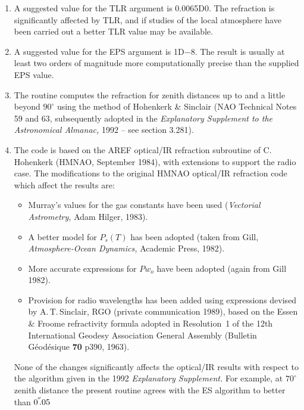 \documentclass[11pt,twoside]{article}
\newcommand{\arcsec}[2] {\arcseci{#1}$\hspace{-0.4em}.#2$}
\newcommand{\arcsec}[2] {
      {$#1\hspace{-0.05em}^{'\hspace{-0.1em}'}\hspace{-0.4em}.#2$}
   }
\newcommand{\arcseci}[1] {$#1\hspace{-0.05em}$\raisebox{-0.5ex}
                         {$^{'\hspace{-0.1em}'}$}}
\renewcommand{\arcseci}[1] {$#1\hspace{-0.05em}^{'\hspace{-0.1em}'}$}
\begin{document}
{
 \begin{enumerate}
  \item A suggested value for the TLR argument is 0.0065D0.  The
        refraction is significantly affected by TLR, and if studies
        of the local atmosphere have been carried out a better TLR
        value may be available.
  \item A suggested value for the EPS argument is 1D$-$8.  The result is
        usually at least two orders of magnitude more computationally
        precise than the supplied EPS value.
  \item The routine computes the refraction for zenith distances up
        to and a little beyond $90^\circ$ using the method of Hohenkerk
        \& Sinclair (NAO Technical Notes 59 and 63, subsequently adopted
        in the {\it Explanatory Supplement to the Astronomical Almanac,}\/
        1992 -- see section 3.281).
  \item The code is based on the AREF optical/IR refraction subroutine
        of C.\,Hohenkerk (HMNAO, September 1984), with extensions to
        support the radio case.  The modifications to the original HMNAO
        optical/IR refraction code which affect the results are:
        \begin{itemize}
         \item Murray's values for the gas constants have been used
               ({\it Vectorial Astrometry,}\/ Adam Hilger, 1983).
         \item A better model for $P_s(T)$ has been adopted (taken from
               Gill, {\it Atmosphere-Ocean Dynamics,}\/ Academic Press, 1982).
         \item More accurate expressions for $Pw_o$ have been adopted
               (again from Gill 1982).
         \item Provision for radio wavelengths has been added using
               expressions devised by A.\,T.\,Sinclair, RGO (private
               communication 1989), based on the Essen \& Froome
               refractivity formula adopted in Resolution~1 of the
               12th International Geodesy Association General Assembly
               (Bulletin G\'{e}od\'{e}sique {\bf 70} p390, 1963).
        \end{itemize}
        None of the changes significantly affects the optical/IR results
        with respect to the algorithm given in the 1992 {\it Explanatory
        Supplement.}\/  For example, at $70^\circ$ zenith distance the present
        routine agrees with the ES algorithm to better than \arcsec{0}{05}

\end{enumerate}}
\end{document}
